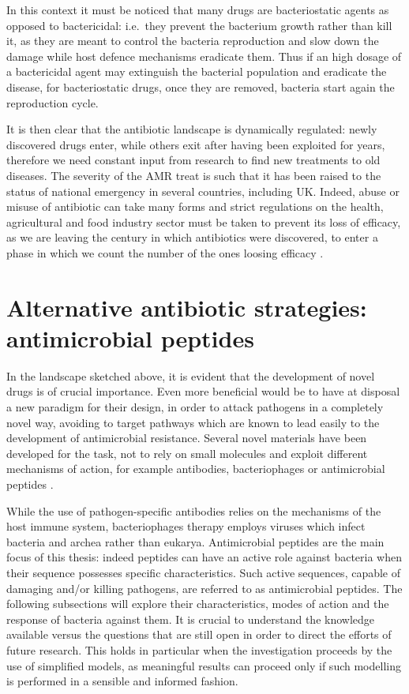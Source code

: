 In this context it must be noticed that many drugs are bacteriostatic agents as opposed to bactericidal: i.e.\ they prevent the bacterium growth rather than kill it, as they are meant to control the bacteria reproduction and slow down the damage while host defence mechanisms eradicate them.
%
Thus if an high dosage of a bactericidal agent may extinguish the bacterial population and eradicate the disease, for bacteriostatic drugs, once they are removed, bacteria start again the reproduction cycle.

It is then clear that the antibiotic landscape is dynamically regulated: newly discovered drugs enter, while others exit after having been exploited for years, therefore we need constant input from research to find new treatments to old diseases. The severity of the AMR treat is such that it has been raised to the status of national emergency in several countries, including UK. Indeed, abuse or misuse of antibiotic can take many forms and strict regulations on the health, agricultural and food industry sector must be taken to prevent its loss of efficacy, as we are leaving the century in which antibiotics were discovered, to enter a phase in which we count the number of the ones loosing efficacy \cite{Oneill2016}.


\section{Alternative antibiotic strategies: antimicrobial peptides}
In the landscape sketched above, it is evident that the development of novel drugs is of crucial importance. Even more beneficial would be to have at disposal a new paradigm for their design, in order to attack pathogens in a completely novel way, avoiding to target pathways which are known to lead easily to the development of antimicrobial resistance. Several novel materials have been developed for the task, not to rely on small molecules and exploit different mechanisms of action, for example antibodies, bacteriophages or antimicrobial peptides \cite{Mantravadi2019}.

While the use of pathogen-specific antibodies relies on the mechanisms of the host immune system, bacteriophages therapy employs viruses which infect bacteria and archea rather than eukarya.
%
Antimicrobial peptides are the main focus of this thesis: indeed peptides can have an active role against bacteria when their sequence possesses specific characteristics. Such active sequences, capable of damaging and/or killing pathogens, are referred to as antimicrobial peptides. The following subsections will explore their characteristics, modes of action and the response of bacteria against them. It is crucial to understand the knowledge available versus the questions that are still open in order to direct the efforts of future research. This holds in particular when the investigation proceeds by the use of simplified models, as meaningful results can proceed only if such modelling is performed in a sensible and informed fashion.

